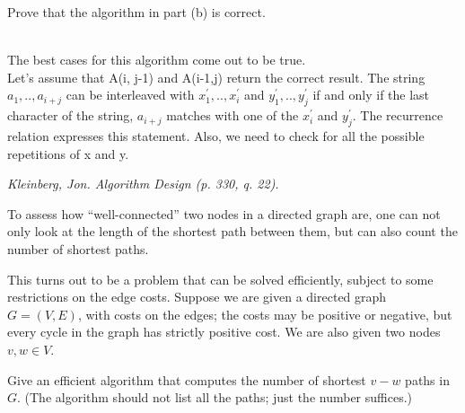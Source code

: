 \documentclass[solutionorbox,answers]{exam}
\begin{document}
\begin{questions}
\begin{parts}
  \newpage
  \item Prove that the algorithm in part (b) is correct.
  \begin{solutionbox}{} \vspace{1em} \\
  The best cases for this algorithm come out to be true.\\
  Let's assume that A(i, j-1) and A(i-1,j) return the correct result. The string $a_{1},..,a_{i+j}$ can be interleaved with $x_{1}^{'},..,x_{i}^{'}$ and $y_{1}^{'},..,y_{j}^{'}$ if and only if the last character of the string, $a_{i+j}$ matches with one of the $x_{i}^{'}$ and $y_{j}^{'}$. The recurrence relation expresses this statement. Also, we need to check for all the possible repetitions of x and y.
  \end{solutionbox}
  \end{parts}



\question \textit{Kleinberg, Jon. Algorithm Design (p. 330, q. 22).} 

To assess how “well-connected” two nodes in a directed graph are, one can not only look at the length of the shortest path between them, but can also count the number of shortest paths. 

This turns out to be a problem that can be solved efficiently, subject to some restrictions on the edge costs. Suppose we are given a directed graph $G = (V, E)$, with costs on the edges; the costs may be positive or negative, but every cycle in the graph has strictly positive cost. We are also given two nodes $v, w\in V$. 

Give an efficient algorithm that computes the number of shortest $v-w$ paths in $G$. (The algorithm should not list all the paths; just the number suffices.) 


\end{questions}
\end{document}
